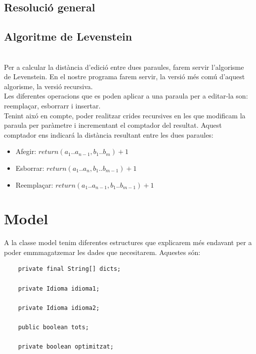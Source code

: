 \documentclass[conference]{IEEEtran}
\begin{document}
    \subsection{Resolució general}


    \subsection{Algoritme de Levenstein}
    \\Per a calcular la distància d'edició entre dues paraules, farem servir l'algorisme de Levenstein. En el nostre programa farem servir, la versió més comú d'aquest algorisme, la versió recursiva.\\

    Les diferentes operacions que es poden aplicar a una paraula per a editar-la son: reemplaçar, esborrarr i insertar.\\
    Tenint aixó en compte, poder realitzar crides recursives en les que modificam la paraula per paràmetre i incrementant el comptador del resultat. Aquest comptador ens indicará la distància resultant entre les dues paraules:
    \begin{itemize}
        \item Afegir: $return  (a_1..a_{n-1}, b_1..b_m) + 1$
        \item Esborrar: $return (a_1..a_n, b_1..b_{m-1}) + 1$
        \item Reemplaçar: $return (a_1..a_{n-1}, b_1..b_{m-1}) + 1$
    \end{itemize}


\section{Model}
 A la classe model tenim diferentes estructures que explicarem més endavant per a poder emmmagatzemar les dades que necesitarem. Aquestes són:
    \begin{verbatim}
    private final String[] dicts;

    private Idioma idioma1;

    private Idioma idioma2;

    public boolean tots;

    private boolean optimitzat;
    \end{verbatim}
\end{document}
